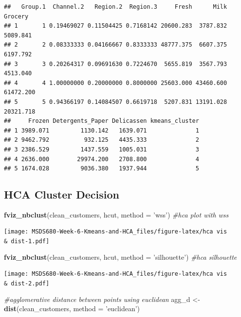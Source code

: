\documentclass[
  english,
  man]{apa6}
\newenvironment{Shaded}{\begin{snugshade}}{\end{snugshade}}
\newcommand{\CommentTok}[1]{\textcolor[rgb]{0.56,0.35,0.01}{\textit{#1}}}
\newcommand{\DataTypeTok}[1]{\textcolor[rgb]{0.13,0.29,0.53}{#1}}
\newcommand{\KeywordTok}[1]{\textcolor[rgb]{0.13,0.29,0.53}{\textbf{#1}}}
\newcommand{\NormalTok}[1]{#1}
\newcommand{\StringTok}[1]{\textcolor[rgb]{0.31,0.60,0.02}{#1}}
\begin{document}
\begin{verbatim}
##   Group.1  Channel.2   Region.2  Region.3     Fresh      Milk   Grocery
## 1       1 0.19469027 0.11504425 0.7168142 20600.283  3787.832  5089.841
## 2       2 0.08333333 0.04166667 0.8333333 48777.375  6607.375  6197.792
## 3       3 0.20264317 0.09691630 0.7224670  5655.819  3567.793  4513.040
## 4       4 1.00000000 0.20000000 0.8000000 25603.000 43460.600 61472.200
## 5       5 0.94366197 0.14084507 0.6619718  5207.831 13191.028 20321.718
##     Frozen Detergents_Paper Delicassen kmeans_cluster
## 1 3989.071         1130.142   1639.071              1
## 2 9462.792          932.125   4435.333              2
## 3 2386.529         1437.559   1005.031              3
## 4 2636.000        29974.200   2708.800              4
## 5 1674.028         9036.380   1937.944              5
\end{verbatim}

\hypertarget{hca-cluster-decision}{%
\subsection{HCA Cluster Decision}\label{hca-cluster-decision}}

\begin{Shaded}
\begin{Highlighting}[]
\KeywordTok{fviz_nbclust}\NormalTok{(clean_customers, hcut, }\DataTypeTok{method  =} \StringTok{'wss'}\NormalTok{) }\CommentTok{#hca plot with wss}
\end{Highlighting}
\end{Shaded}

\texttt{[image: MSDS680-Week-6-Kmeans-and-HCA\_files/figure-latex/hca vis \\\& dist-1.pdf]}

\begin{Shaded}
\begin{Highlighting}[]
\KeywordTok{fviz_nbclust}\NormalTok{(clean_customers, hcut, }\DataTypeTok{method  =} \StringTok{'silhouette'}\NormalTok{) }\CommentTok{#hca silhouette}
\end{Highlighting}
\end{Shaded}

\texttt{[image: MSDS680-Week-6-Kmeans-and-HCA\_files/figure-latex/hca vis \\\& dist-2.pdf]}

\begin{Shaded}
\begin{Highlighting}[]
\CommentTok{#agglomerative distance between points using euclidean }
\NormalTok{agg_d <-}\StringTok{ }\KeywordTok{dist}\NormalTok{(clean_customers, }\DataTypeTok{method =} \StringTok{'euclidean'}\NormalTok{) }
\end{Highlighting}
\end{Shaded}
\end{document}
